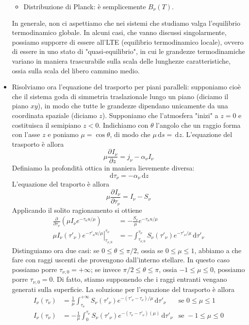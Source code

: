 \documentclass[a4paper,11pt]{article}
\renewcommand{\d}{\mathrm{d}} %
\newcommand{\pder}[3][]{\frac{\partial ^{#1}#2}{\partial {#3}^{#1}}} %
\renewcommand{\d}{\,\mathrm{d}}
\theoremstyle{theorem}
\theoremstyle{definition}
\begin{document}
\begin{itemize}
\begin{itemize}
		\item Distribuzione di Planck: è semplicemente $B_\nu(T)$.
	\end{itemize}
	In generale, non ci aspettiamo che nei sistemi che studiamo valga l'equilibrio termodinamico globale. In alcuni casi, che vanno discussi singolarmente, possiamo supporre di essere all'LTE (equilibrio termodinamico locale), ovvero di essere in uno stato di "quasi-equilibrio", in cui le grandezze termodinamiche variano in maniera trascurabile sulla scala delle lunghezze caratteristiche, ossia sulla scala del libero cammino medio. 
	\item Risolviamo ora l'equazione del trasporto per piani paralleli: supponiamo cioè che il sistema goda di simmetria traslazionale lungo un piano (diciamo il piano $xy$), in modo che tutte le grandezze dipendano unicamente da una coordinata spaziale (diciamo $z$). Supponiamo che l'atmosfera "inizi" a $z=0$ e costituisca il semipiano $z<0$. Indichiamo con $\theta$ l'angolo che un raggio forma con l'asse $z$ e poniamo $\mu=\cos\theta$, di modo che $\mu\d s=\d z$. L'equazione del trasporto è allora
	\[\mu\pder{I_\nu}{z}=j_\nu-\alpha_\nu I_\nu\]
	Definiamo la profondità ottica in maniera lievemente diversa:
	\[\d\tau_\nu=-\alpha_\nu \d z\]
	L'equazione del traporto è allora
	\[\mu\pder{I_\nu}{\tau_\nu}=I_\nu-S_\nu\]
	Applicando il solito ragionamento si ottiene
	\begin{align*}
	\pder{}{\tau_\nu}\left(\mu I_\nu e^{-\tau_nu/\mu}\right)&=-\frac{S_\nu}{\mu}e^{-\tau_nu/\mu}\\
	\left.\mu I_\nu(\tau'_\nu)e^{-\tau'_nu/\mu}\right|_{\tau_{\nu,0}}^{\tau_\nu}&=-\int_{\tau_{\nu,0}}^{\tau_\nu}S_{\nu}(\tau'_\nu)e^{-\tau'_\nu/\mu}\d\tau'_\nu
	\end{align*}
	Distinguiamo ora due casi: se $0\leq\theta\leq\pi/2$, ossia se $0\leq\mu\leq1$, abbiamo a che fare con raggi uscenti che provengono dall'interno stellare. In questo caso possiamo porre $\tau_{\nu,0}=+\infty$; se invece $\pi/2\leq\theta\leq\pi$, ossia $-1\leq\mu\leq0$, possiamo porre $\tau_{\nu,0}=0$. Di fatto, stiamo supponendo che i raggi entranti vengano generati sulla superficie. La soluzione per l'equazione del trasporto è allora
	\begin{align*}
		I_\nu(\tau_\nu)&=\frac{1}{\mu}\int_{\tau_\nu}^{+\infty}S_\nu(\tau'_\nu)e^{-(\tau'_\nu-\tau_\nu)/\mu}\d\tau'_\nu&\textrm{se }0\leq\mu\leq1\\ I_\nu(\tau_\nu)&=-\frac{1}{\mu}\int_{0}^{\tau_\nu}S_\nu(\tau'_\nu)e^{-(\tau_\nu-\tau'_\nu)(\mu)}\d\tau'_\nu&\textrm{se }-1\leq\mu\leq0

\end{align*}
\end{itemize}
\end{document}

